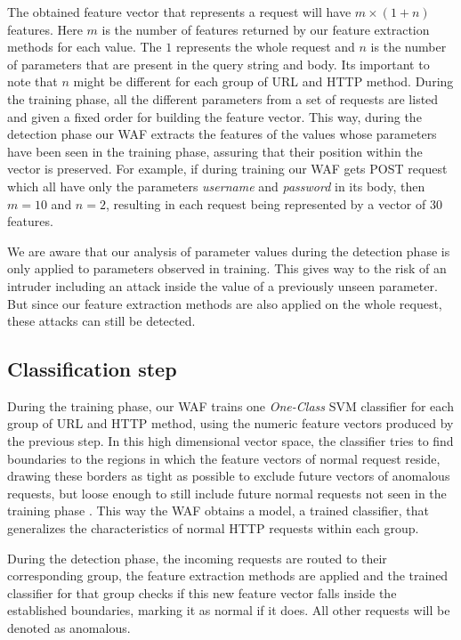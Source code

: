 The obtained feature vector that represents a request will have
$m \times (1 + n)$ features.
Here $m$ is the number of features returned by our feature extraction
methods for each value.
The $1$ represents the whole request and $n$ is the number of parameters
that are present in the query string and body.
Its important to note that $n$ might be different for each group of URL
and HTTP method.
During the training phase, all the different parameters from a set of
requests are listed and given a fixed order for building the feature vector.
This way, during the detection phase our WAF extracts the features of the
values whose parameters have been seen in the training phase, assuring that
their position within the vector is preserved.
For example, if during training our WAF gets POST request which all have
only the parameters \textit{username} and \textit{password} in its body,
then $m = 10$ and $n = 2$, resulting in each request being represented by
a vector of 30 features.

We are aware that our analysis of parameter values during the detection
phase is only applied to parameters observed in training.
This gives way to the risk of an intruder including an attack inside the
value of a previously unseen parameter.
But since our feature extraction methods are also applied on the whole
request, these attacks can still be detected.


\subsection{Classification step}

During the training phase, our WAF trains one \textit{One-Class} SVM
classifier for each group of URL and HTTP method, using the numeric
feature vectors produced by the previous step.
In this high dimensional vector space, the classifier tries to find boundaries
to the regions in which the feature vectors of normal request reside,
drawing these borders as tight as possible to exclude future vectors of
anomalous requests, but loose enough to still include future normal requests
not seen in the training phase \cite{perdisci2006using}.
This way the WAF obtains a model, a trained classifier, that generalizes
the characteristics of normal HTTP requests within each group.

During the detection phase, the incoming requests are routed to their
corresponding group, the feature extraction methods are applied and the
trained classifier for that group checks if this new feature vector
falls inside the established boundaries, marking it as normal if it does.
All other requests will be denoted as anomalous.

